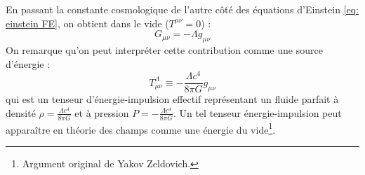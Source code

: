 \begin{rmk}
    En passant la constante cosmologique de l'autre côté des équations d'Einstein \ref{eq: einstein FE}, on obtient dans le vide ($T^{\mu\nu} = 0$) :
    \begin{equation}
        G_{\mu\nu} = -\Lambda g_{\mu\nu}
    \end{equation}
    On remarque qu'on peut interpréter cette contribution comme une source d'énergie : 
    \begin{equation}
        T^\Lambda_{\mu\nu} \equiv - \frac{\Lambda c^4}{8 \pi G} g_{\mu\nu}
    \end{equation}
    qui est un tenseur d'énergie-impulsion effectif représentant un fluide parfait à densité $\rho = \frac{\Lambda c^4}{8 \pi G}$ et à pression $P = - \frac{\Lambda c^4}{8 \pi G}$. Un tel tenseur énergie-impulsion peut apparaître en théorie des champs comme une énergie du vide\footnote{Argument original de Yakov Zeldovich.}.
\end{rmk}
